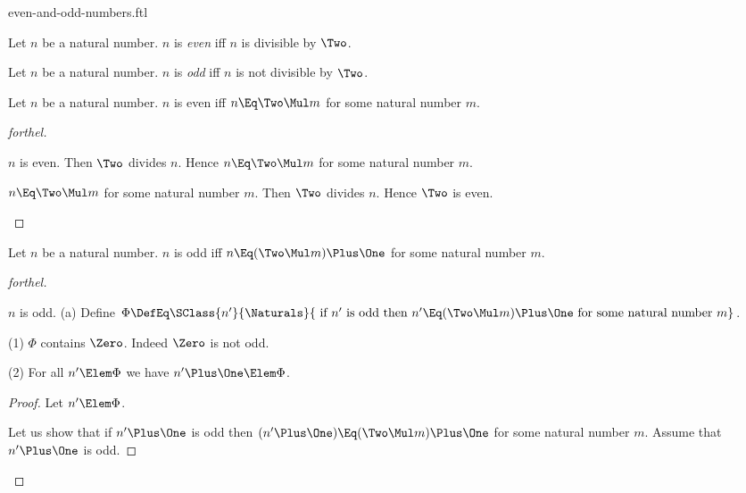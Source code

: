 \documentclass{stex}
\begin{document}
\begin{smodule}{even-and-odd-numbers.ftl}



\begin{definition*}[forthel,for=even]
  Let $n$ be a natural number.
  $n$ is \emph{even} iff $n$ is divisible by $\Two$.
\end{definition*}

\begin{definition*}[forthel,for=odd]
  Let $n$ be a natural number.
  $n$ is \emph{odd} iff $n$ is not divisible by $\Two$.
\end{definition*}

\begin{proposition*}[forthel]
  Let $n$ be a natural number.
  $n$ is even iff $n \Eq \Two \Mul m$ for some natural number $m$.
\end{proposition*}
\begin{proof}[forthel]
  \begin{case}{$n$ is even.}
    Then $\Two$ divides $n$.
    Hence $n \Eq \Two \Mul m$ for some natural number $m$.
  \end{case}

  \begin{case}{$n \Eq \Two \Mul m$ for some natural number $m$.}
    Then $\Two$ divides $n$.
    Hence $\Two$ is even.
  \end{case}
\end{proof}

\begin{proposition*}[forthel]
  Let $n$ be a natural number.
  $n$ is odd iff $n \Eq (\Two \Mul m) \Plus \One$ for some natural number $m$.
\end{proposition*}
\begin{proof}[forthel]
  \begin{case}{$n$ is odd.}
    (a) Define $\Phi \DefEq \SClass{n'}{\Naturals}{\text{ if }n'\text{ is odd then }n' \Eq (\Two \Mul m) \Plus \One\text{ for some natural number }m}$.

    (1) $\Phi$ contains $\Zero$.
    Indeed $\Zero$ is not odd.

    (2) For all $n' \Elem \Phi$ we have $n' \Plus \One \Elem \Phi$. 
    \begin{proof}
      Let $n' \Elem \Phi$.

      Let us show that if $n' \Plus  \One$ is odd then $(n' \Plus  \One) \Eq (\Two \Mul m) \Plus  \One$ for some natural number $m$.
        Assume that $n' \Plus  \One$ is odd.


\end{proof}
\end{case}
\end{proof}
\end{smodule}
\end{document}
